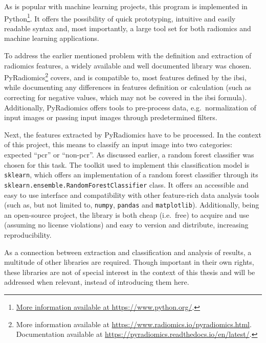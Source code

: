As is popular with machine learning projects, this program is implemented in 
Python\footnote{\hyperlink{https://www.python.org/}{More information available 
at https://www.python.org/}.}. It offers the possibility of quick prototyping, 
intuitive and easily readable syntax and, most importantly, a large tool set for
both radiomics and machine learning applications. 

To address the earlier mentioned problem with the definition and extraction of
radiomics features, a widely available and well documented library was chosen.
PyRadiomics\footnote{More information available at 
\hyperlink{https://www.radiomics.io/pyradiomics.html}
{https://www.radiomics.io/pyradiomics.html}.\\Documentation available at 
\hyperlink{https://pyradiomics.readthedocs.io/en/latest/}
{https://pyradiomics.readthedocs.io/en/latest/}.} covers, and is compatible to,
most features defined by the \ac{ibsi}, while documenting any differences in 
features definition or calculation (such as correcting for negative values, 
which may not be covered in the \ac{ibsi} formula).
Additionally, PyRadiomics offers tools to pre-process data, e.g.~normalization
of input images or passing input images through predetermined filters.

Next, the features extracted by PyRadiomics have to be processed. In the context
of this project, this means to classify an input image into two categories: 
expected \enquote{\ac{pcr}} or \enquote{non-\ac{pcr}}. As discussed earlier, %
a random forest classifier was chosen for this task. The toolkit used to 
implement this classification model is \texttt{sklearn}, which offers an 
implementation of a random forest classifier through
its \\\texttt{sklearn.ensemble.RandomForestClassifier} class. It offers an
accessible and easy to use interface and compatibility with other feature-rich
data analysis tools (such as, but not limited to, \texttt{numpy}, 
\texttt{pandas} and \texttt{matplotlib}). Additionally, being an open-source
project, the library is both cheap (i.e.~free) to acquire and use 
(assuming no license violations) and easy to version and distribute, increasing 
reproducibility. 

As a connection between extraction and classification and analysis of results, a
multitude of other libraries are required. Though important in their own rights,
these libraries are not of special interest in the context of this thesis and 
will be addressed when relevant, instead of introducing them here.

